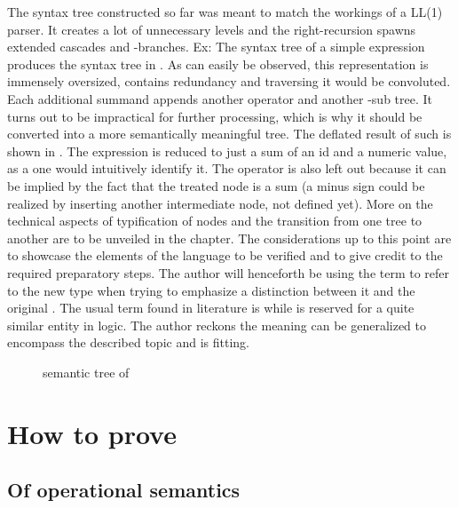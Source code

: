 The syntax tree constructed so far was meant to match the workings of a LL(1) parser. It creates a lot of unnecessary levels and the right-recursion spawns extended cascades and \textemptyword{}-branches. Ex: The syntax tree of a simple expression  produces the syntax tree in . As can easily be observed, this representation is immensely oversized, contains redundancy and traversing it would be convoluted. Each additional summand appends another operator and another -sub tree. It turns out to be impractical for further processing, which is why it should be converted into a more semantically meaningful tree. The deflated result of such is shown in . The expression is reduced to just a sum of an id and a numeric value, as a one would intuitively identify it. The operator is also left out because it can be implied by the fact that the treated node is a sum (a minus sign could be realized by inserting another intermediate  node, not defined yet). More on the technical aspects of typification of nodes and the transition from one tree to another are to be unveiled in the  chapter. The considerations up to this point are to showcase the elements of the language to be verified and to give credit to the required preparatory steps. The author will henceforth be using the term  to refer to the new type when trying to emphasize a distinction between it and the original . The usual term found in literature is  while  is reserved for a quite similar entity in logic. The author reckons the meaning can be generalized to encompass the described topic and is fitting.

\begin{figure}
	\begin{center}
		
	\end{center}

	\caption{semantic tree of }
	\label{fig:tree_semanticTree_semantic_A1}
\end{figure}

\chapter{How to prove}

\section{Of operational semantics}

